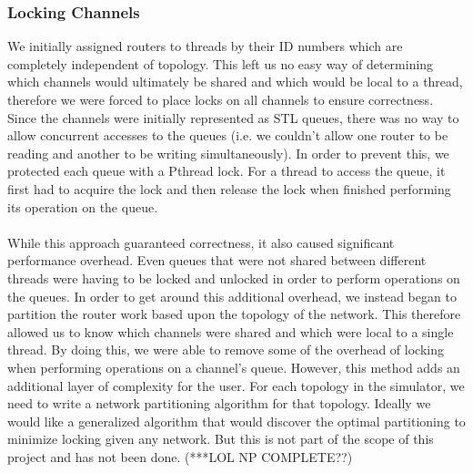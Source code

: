 \documentclass[twocolumn]{article}
\begin{document}
\subsubsection{Locking Channels}
We initially assigned routers to threads by their ID numbers which are completely independent of
topology.  This left us no easy way of determining which channels would
ultimately be shared and which would be local to a thread, therefore we
were forced to place locks on all channels to ensure correctness.  Since
the channels were initially represented as STL queues, there was no way to
allow concurrent accesses to the queues (i.e. we couldn't allow one router
to be reading and another to be writing simultaneously).  In order to
prevent this, we protected each queue with a Pthread lock.  For a thread
to access the queue, it first had to acquire the lock and then release the
lock when finished performing its operation on the queue.\\
~\\
While this approach guaranteed correctness, it also caused significant
performance overhead.  Even queues that were not shared between different
threads were having to be locked and unlocked in order to perform
operations on the queues.  In order to get around this additional
overhead, we instead began to partition the router work based upon the
topology of the network.  This therefore allowed us to know which channels
were shared and which were local to a single thread.  By doing this, we
were able to remove some of the overhead of locking when performing
operations on a channel's queue. However, this method adds an additional layer of complexity for the user. For each topology in the simulator, we need to write a network partitioning algorithm for that topology. Ideally we would like a generalized algorithm that would discover the optimal partitioning to minimize locking given any network. But this is not part of the scope of this project and has not been done. (***LOL NP COMPLETE??)
\end{document}
